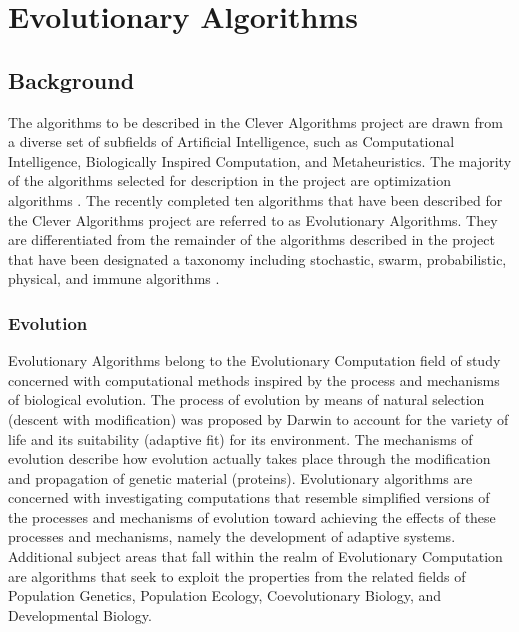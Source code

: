 \documentclass[a4paper, 11pt]{article}
\begin{document}
% 
% 
\section{Evolutionary Algorithms}
\label{sec:algorithms}

% 
% 
\subsection{Background}
The algorithms to be described in the Clever Algorithms project are drawn from a diverse set of subfields of Artificial Intelligence, such as Computational Intelligence, Biologically Inspired Computation, and Metaheuristics. The majority of the algorithms selected for description in the project are optimization algorithms \cite{Brownlee2010b}. 
The recently completed ten algorithms that have been described for the Clever Algorithms project are referred to as Evolutionary Algorithms. They are differentiated from the remainder of the algorithms described in the project that have been designated a taxonomy including stochastic, swarm, probabilistic, physical, and immune algorithms \cite{Brownlee2010b}. 

\subsubsection{Evolution}
Evolutionary Algorithms belong to the Evolutionary Computation field of study concerned with computational methods inspired by the process and mechanisms of biological evolution. The process of evolution by means of natural selection (descent with modification) was proposed by Darwin to account for the variety of life and its suitability (adaptive fit) for its environment. The mechanisms of evolution describe how evolution actually takes place through the modification and propagation of genetic material (proteins). Evolutionary algorithms are concerned with investigating computations that resemble simplified versions of the processes and mechanisms of evolution toward achieving the effects of these processes and mechanisms, namely the development of adaptive systems.
Additional subject areas that fall within the realm of Evolutionary Computation are algorithms that seek to exploit the properties from the related fields of Population Genetics, Population Ecology, Coevolutionary Biology, and Developmental Biology. 

\end{document}
